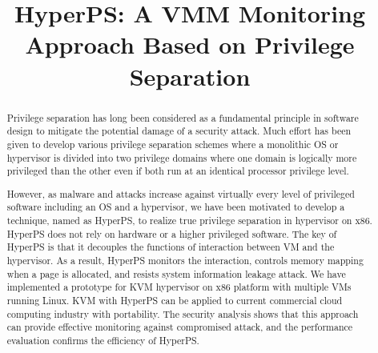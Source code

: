 \documentclass[conference]{IEEEtran}
\begin{document}
\title{HyperPS: A VMM Monitoring Approach Based on Privilege Separation}

\maketitle



\begin{abstract}

Privilege separation has long been considered as a
fundamental principle in software design to mitigate the potential
damage of a security attack. Much effort has been given to
develop various privilege separation schemes where a monolithic
OS or hypervisor is divided into two privilege domains where
one domain is logically more privileged than the other even
if both run at an identical processor privilege level.

However, as malware and attacks increase
against virtually every level of privileged software including
an OS and a hypervisor, we have been motivated to develop a
technique, named as HyperPS, to realize true privilege
separation in hypervisor on x86. HyperPS does not rely on hardware or a higher privileged software. 
The key of HyperPS is that it decouples the functions of interaction between VM and the hypervisor. As a result, HyperPS monitors the interaction, controls memory mapping when a page is allocated, and resists system information leakage attack.
We have implemented a prototype for KVM hypervisor on x86 platform with multiple VMs running Linux. KVM with HyperPS can be applied to current commercial cloud computing industry with portability. The security analysis shows that this approach can provide effective monitoring against compromised attack, and the performance evaluation confirms the efficiency of HyperPS.




\end{abstract}
\end{document}
